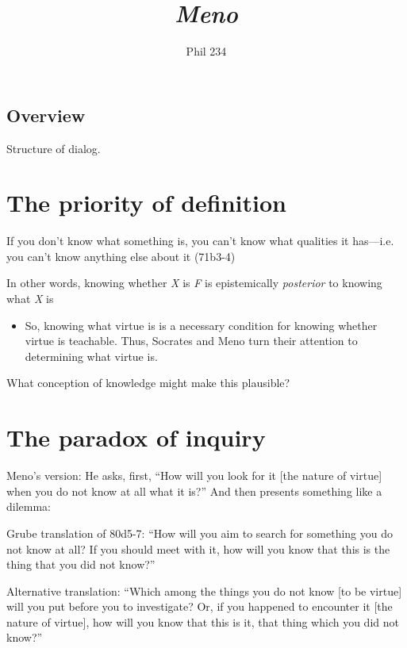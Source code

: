 \documentclass[10 pt]{article}
\begin{document}
\author{Phil 234}
\title{\emph{Meno}}
\maketitle

\subsection{Overview}

Structure of dialog.

\section*{The priority of definition}

\noindent If you don't know what something is, you can't know what qualities it has---i.e. you can't know anything else about it (71b3-4)
\vspace*{2mm}

\noindent In other words, knowing whether \emph{X} is \emph{F} is epistemically \emph{posterior} to knowing what \emph{X} is

\begin{itemize}\item{So, knowing what virtue is is a necessary condition for knowing whether virtue is teachable. Thus, Socrates and Meno turn their attention to determining what virtue is.}\end{itemize}

\noindent What conception of knowledge might make this plausible?

\section*{The paradox of inquiry}

\noindent Meno's version: He asks, first, ``How will you look for it [the nature of virtue] when you do not know at all what it is?'' And then presents something like a dilemma:
\vspace*{2mm}

\noindent Grube translation of 80d5-7: ``How will you aim to search for something you do not know at all? If you should meet with it, how will you know that this is the thing that you did not know?''
\vspace*{2mm}

\noindent Alternative translation: ``Which among the things you do not know [to be virtue] will you put before you to investigate? Or, if you happened to encounter it [the nature of virtue], how will you know that this is it, that thing which you did not know?''
\vspace*{2mm}
\end{document}
